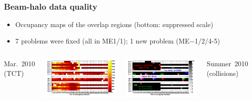 \documentclass[compress]{beamer}
\begin{document}
\begin{frame}
\frametitle{Beam-halo data quality}

\begin{itemize}
\item Occupancy maps of the overlap regions (bottom: suppressed scale)
\item 7 problems were fixed (all in ME1/1); 1 new problem \mbox{(ME$-$1/2/4-5)\hspace{-1 cm}}
\end{itemize}

\begin{columns}
\centering Mar.~2010 (TCT)

\includegraphics[width=\linewidth]{occupancy_March2010.pdf}

\includegraphics[width=\linewidth]{occupancy_problems_March2010.pdf}

\centering Summer~2010 (collisions)


\end{columns}
\end{frame}
\end{document}
